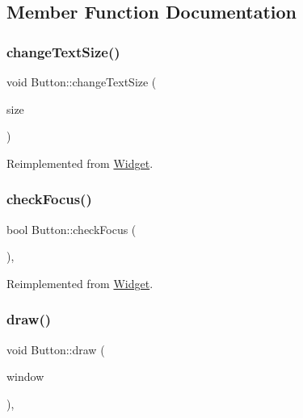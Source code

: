 \subsection{Member Function Documentation}
\mbox{\label{class_button_a21ed9f803ceeef9c846191f2ed26a2f3}} 
\subsubsection{\texorpdfstring{changeTextSize()}{changeTextSize()}}
{\footnotesize\ttfamily void Button\+::change\+Text\+Size (\begin{DoxyParamCaption}\item[{int}]{size }\end{DoxyParamCaption})\hspace{0.3cm}{\ttfamily [virtual]}}



Reimplemented from \mbox{\hyperlink{class_widget_a958763d528cd422de5f248d83530f68b}{Widget}}.

\mbox{\label{class_button_a73a90ae2e4101b7d28d24c1c8ec905db}} 
\subsubsection{\texorpdfstring{checkFocus()}{checkFocus()}}
{\footnotesize\ttfamily bool Button\+::check\+Focus (\begin{DoxyParamCaption}{ }\end{DoxyParamCaption})\hspace{0.3cm}{\ttfamily [override]}, {\ttfamily [virtual]}}



Reimplemented from \mbox{\hyperlink{class_widget_ac8121758d9fcfedb4ff119abeb7d0652}{Widget}}.

\mbox{\label{class_button_a57937c3a08fac52fede0362b8ee6c39e}} 
\subsubsection{\texorpdfstring{draw()}{draw()}}
{\footnotesize\ttfamily void Button\+::draw (\begin{DoxyParamCaption}\item[{sf\+::\+Render\+Window \&}]{window }\end{DoxyParamCaption})\hspace{0.3cm}{\ttfamily [override]}, {\ttfamily [virtual]}}



